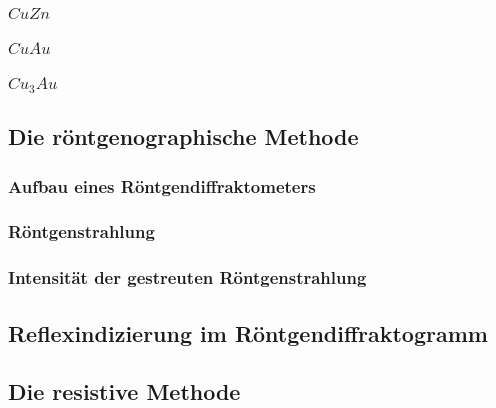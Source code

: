         \subsubsection{$CuZn$}
            
        \subsubsection{$CuAu$}

        \subsubsection{$Cu_3Au$}

    \subsection{Die röntgenographische Methode}

        \subsubsection{Aufbau eines Röntgendiffraktometers}   

        \subsubsection{Röntgenstrahlung}

        \subsubsection{Intensität der gestreuten Röntgenstrahlung}

        \subsection{Reflexindizierung im Röntgendiffraktogramm}
    
    \subsection{Die resistive Methode}
        
